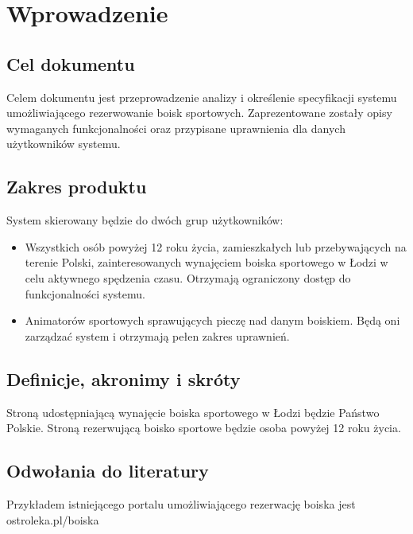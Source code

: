 \documentclass[a4paper, portrait,11pt]{article}
\begin{document}
\section {Wprowadzenie}

\subsection {Cel dokumentu}
Celem dokumentu jest przeprowadzenie analizy i określenie specyfikacji systemu umożliwiającego rezerwowanie boisk sportowych. Zaprezentowane zostały opisy wymaganych funkcjonalności oraz przypisane uprawnienia dla danych użytkowników systemu.

\subsection {Zakres produktu}
System skierowany będzie do dwóch grup użytkowników:
\begin{itemize}
	\item Wszystkich osób powyżej 12 roku życia, zamieszkałych lub przebywających na terenie Polski, zainteresowanych wynajęciem boiska sportowego w Łodzi w celu aktywnego spędzenia czasu. Otrzymają ograniczony dostęp do funkcjonalności systemu.
	\item Animatorów sportowych sprawujących pieczę nad danym boiskiem. Będą oni zarządzać system i otrzymają pełen zakres uprawnień.
\end{itemize}

\subsection {Definicje, akronimy i skróty}
Stroną udostępniającą wynajęcie boiska sportowego w Łodzi będzie Państwo Polskie.
Stroną rezerwującą boisko sportowe będzie osoba powyżej 12 roku życia. 

\subsection {Odwołania do literatury}
Przykładem istniejącego portalu umożliwiającego rezerwację boiska jest ostroleka.pl/boiska
\end{document}
